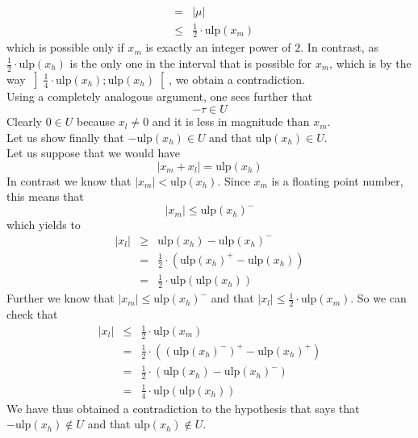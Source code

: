 \documentclass[a4paper,10pt,twoside]{article}
\newenvironment{proof}[1][Proof]{\begin{trivlist}
\item[\hskip \labelsep {\bfseries #1}]}{\end{trivlist}}
\newcommand{\hi}{\ensuremath{\mathit{h}}}
\newcommand{\mi}{\ensuremath{\mathit{m}}}
\newcommand{\lo}{\ensuremath{\mathit{l}}}
\newcommand{\mUlp}{\ensuremath{\mathrm{ulp}}}
\begin{document}
\begin{proof}
\begin{eqnarray*}
& = & \left \vert \mu \right \vert \\
& \leq & \frac{1}{2} \cdot \mUlp\left( x_\mi \right)
\end{eqnarray*}
which is possible only if $x_\mi$ is exactly an integer power of $2$. In contrast, as
$\frac{1}{2} \cdot \mUlp\left( x_\hi \right)$ is the only one in the interval that is possible for $x_\mi$, which is
by the way
$\left] \frac{1}{4} \cdot \mUlp\left( x_\hi \right) ; \mUlp\left( x_\hi \right) \right[$, we obtain a contradiction. \\
Using a completely analogous argument, one sees further that
$$-\tau \in U$$
Clearly $0 \in U$ because $x_\lo \not = 0$ and it is less in magnitude than $x_\mi$. \\
Let us show finally that
$-\mUlp\left( x_\hi \right) \in U$ and that $\mUlp\left( x_\hi \right) \in U$.\\
Let us suppose that we would have
$$\left \vert x_\mi + x_\lo \right \vert = \mUlp\left( x_\hi \right)$$
In contrast we know that $\left \vert x_\mi \right \vert < \mUlp\left( x_\hi \right)$.
Since $x_\mi$ is a floating point number, this means that
$$\left \vert x_\mi \right \vert \leq \mUlp\left( x_\hi \right)^-$$
which yields to
\begin{eqnarray*}
\left \vert x_\lo \right \vert & \geq & \mUlp\left( x_\hi \right) - \mUlp\left( x_\hi \right)^- \\
& = & \frac{1}{2} \cdot \left( \mUlp\left(x_\hi \right)^+ - \mUlp\left( x_\hi \right) \right) \\
& = & \frac{1}{2} \cdot \mUlp \left( \mUlp \left( x_\hi \right) \right)
\end{eqnarray*}
Further we know that $\left \vert x_\mi \right \vert \leq \mUlp\left( x_\hi \right)^-$ and that
$\left \vert x_\lo \right \vert \leq \frac{1}{2} \cdot \mUlp\left( x_\mi \right)$.
So we can check that
\begin{eqnarray*}
\left \vert x_\lo \right \vert & \leq & \frac{1}{2} \cdot \mUlp\left( x_\mi \right) \\
& = & \frac{1}{2} \cdot \left( \left( \mUlp\left( x_\hi \right)^- \right)^+ - \mUlp\left( x_\hi \right)^+ \right) \\
& = & \frac{1}{2} \cdot \left( \mUlp\left( x_\hi \right) - \mUlp\left( x_\hi \right)^- \right) \\
& = & \frac{1}{4} \cdot \mUlp \left( \mUlp \left( x_\hi \right) \right)
\end{eqnarray*}
We have thus obtained a contradiction to the hypothesis that says that
$-\mUlp\left( x_\hi \right) \not \in U$ and that $\mUlp\left( x_\hi \right) \not \in U$. \\

\end{proof}
\end{document}
